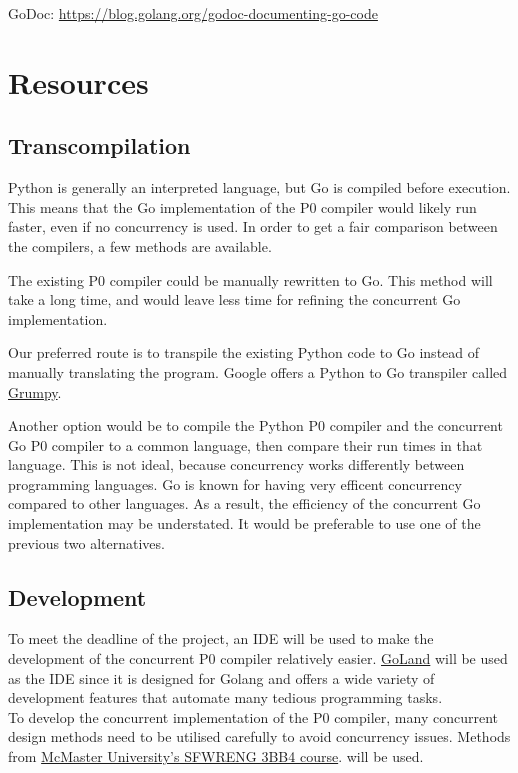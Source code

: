 \documentclass{article}
\begin{document}
GoDoc: \url{https://blog.golang.org/godoc-documenting-go-code}

\section{Resources}

\subsection{Transcompilation} %

Python is generally an interpreted language, but Go is compiled before execution.
This means that the Go implementation of the P0 compiler would likely run
faster, even if no concurrency is used.
In order to get a fair comparison between the compilers, a few methods are
available.

The existing P0 compiler could be manually rewritten to Go.
This method will take a long time, and would leave less time for refining the
concurrent Go implementation.

Our preferred route is to transpile the existing Python code to Go instead of
manually translating the program.
Google offers a Python to Go transpiler called
\href{https://github.com/google/grumpy}{Grumpy}.

Another option would be to compile the Python P0 compiler and the concurrent Go
P0 compiler to a common language, then compare their run times in that 
language.
This is not ideal, because concurrency works differently between programming
languages.
Go is known for having very efficent concurrency compared to other languages.
As a result, the efficiency of the concurrent Go implementation may be
understated.
It would be preferable to use one of the previous two alternatives.

\subsection{Development} %
To meet the deadline of the project, an IDE will be used to make the development of the concurrent
P0 compiler relatively easier. \href{https://www.jetbrains.com/go/}{GoLand} will be used as the IDE
since it is designed for Golang and offers a wide variety of development features that automate
many tedious programming tasks.\\
To develop the concurrent implementation of the P0 compiler, many concurrent design methods
need to be utilised carefully to avoid concurrency issues. Methods from \href{https://www.cas.mcmaster.ca/~se3bb4/}{McMaster University's SFWRENG 3BB4 course}. will
be used.\\
\end{document}
